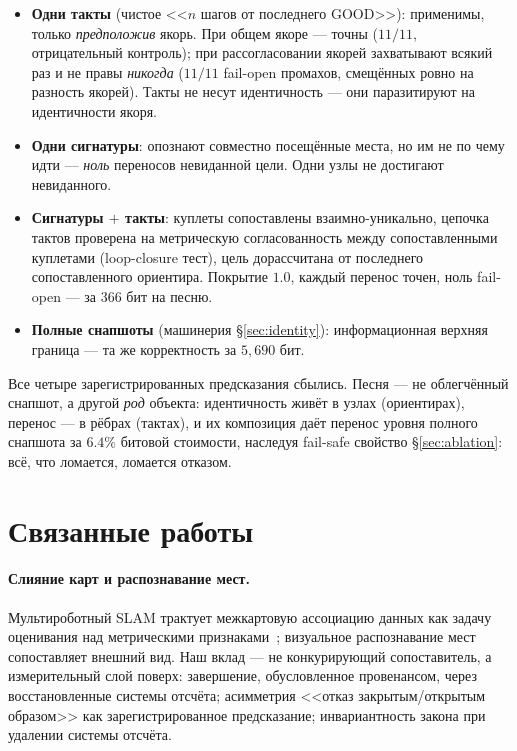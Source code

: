 \documentclass{article}
\begin{document}
\begin{itemize}[leftmargin=16pt,itemsep=2pt,topsep=2pt]
\item \textbf{Одни такты} (чистое <<$n$ шагов от последнего GOOD>>):
  применимы, только \emph{предположив} якорь. При общем якоре ---
  точны ($11/11$, отрицательный контроль); при рассогласовании якорей
  захватывают всякий раз и не правы \emph{никогда} ($11/11$ fail-open
  промахов, смещённых ровно на разность якорей). Такты не несут
  идентичность --- они паразитируют на идентичности якоря.
\item \textbf{Одни сигнатуры}: опознают совместно посещённые места,
  но им не по чему идти --- \emph{ноль} переносов невиданной цели.
  Одни узлы не достигают невиданного.
\item \textbf{Сигнатуры $+$ такты}: куплеты сопоставлены
  взаимно-уникально, цепочка тактов проверена на метрическую
  согласованность между сопоставленными куплетами (loop-closure
  тест), цель дорассчитана от последнего сопоставленного ориентира.
  Покрытие $1.0$, каждый перенос точен, ноль fail-open --- за $366$
  бит на песню.
\item \textbf{Полные снапшоты} (машинерия \S\ref{sec:identity}):
  информационная верхняя граница --- та же корректность за $5{,}690$
  бит.
\end{itemize}

Все четыре зарегистрированных предсказания сбылись. Песня --- не
облегчённый снапшот, а другой \emph{род} объекта: идентичность живёт
в узлах (ориентирах), перенос --- в рёбрах (тактах), и их композиция
даёт перенос уровня полного снапшота за $6.4\%$ битовой стоимости,
наследуя fail-safe свойство \S\ref{sec:ablation}: всё, что ломается,
ломается отказом.

\section{Связанные работы}
\label{sec:related}

\paragraph{Слияние карт и распознавание мест.} Мультироботный SLAM
трактует межкартовую ассоциацию данных как задачу оценивания над
метрическими признаками~\cite{cadena2016slam}; визуальное
распознавание мест~\cite{lowry2016vpr} сопоставляет внешний вид. Наш
вклад --- не конкурирующий сопоставитель, а измерительный слой поверх:
завершение, обусловленное провенансом, через восстановленные системы
отсчёта; асимметрия <<отказ закрытым/открытым образом>> как
зарегистрированное предсказание; инвариантность закона при удалении
системы отсчёта.
\end{document}
